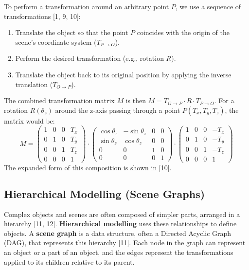 \documentclass[12pt]{article}
\begin{document}
To perform a transformation around an arbitrary point $P$, we use a sequence of transformations [1, 9, 10]:

\begin{enumerate}
    \item Translate the object so that the point $P$ coincides with the origin of the scene's coordinate system ($T_{P \rightarrow O}$).
    \item Perform the desired transformation (e.g., rotation $R$).
    \item Translate the object back to its original position by applying the inverse translation ($T_{O \rightarrow P}$).
\end{enumerate}
The combined transformation matrix $M$ is then $M = T_{O \rightarrow P} \cdot R \cdot T_{P \rightarrow O}$. For a rotation $R(\theta_z)$ around the z-axis passing through a point $P(T_x, T_y, T_z)$, the matrix would be:
\[
M = \begin{pmatrix} 1 & 0 & 0 & T_x \\ 0 & 1 & 0 & T_y \\ 0 & 0 & 1 & T_z \\ 0 & 0 & 0 & 1 \end{pmatrix} \cdot \begin{pmatrix} \cos\theta_z & -\sin\theta_z & 0 & 0 \\ \sin\theta_z & \cos\theta_z & 0 & 0 \\ 0 & 0 & 1 & 0 \\ 0 & 0 & 0 & 1 \end{pmatrix} \cdot \begin{pmatrix} 1 & 0 & 0 & -T_x \\ 0 & 1 & 0 & -T_y \\ 0 & 0 & 1 & -T_z \\ 0 & 0 & 0 & 1 \end{pmatrix}
\]
The expanded form of this composition is shown in [10].

\subsection{Hierarchical Modelling (Scene Graphs)}

Complex objects and scenes are often composed of simpler parts, arranged in a hierarchy [11, 12]. \textbf{Hierarchical modelling} uses these relationships to define objects. A \textbf{scene graph} is a data structure, often a Directed Acyclic Graph (DAG), that represents this hierarchy [11]. Each node in the graph can represent an object or a part of an object, and the edges represent the transformations applied to its children relative to its parent.
\end{document}
